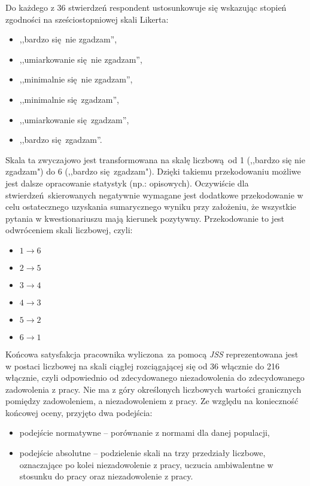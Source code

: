 Do każdego z 36 stwierdzeń respondent ustosunkowuje się wskazując stopień zgodności na sześciostopniowej skali Likerta: 
\begin{itemize}
\item ,,bardzo się nie zgadzam'',
\item ,,umiarkowanie się nie zgadzam'',
\item ,,minimalnie się nie zgadzam'',
\item ,,minimalnie się zgadzam'',
\item ,,umiarkowanie się zgadzam'',
\item ,,bardzo się zgadzam''.
\end{itemize}
Skala ta zwyczajowo jest transformowana na skalę liczbową od 1 (,,bardzo się nie zgadzam") do 6 (,,bardzo się zgadzam"). Dzięki takiemu przekodowaniu możliwe jest dalsze opracowanie statystyk (np.: opisowych). Oczywiście dla stwierdzeń skierowanych negatywnie wymagane jest dodatkowe przekodowanie w celu ostatecznego uzyskania sumarycznego wyniku przy założeniu, że wszystkie pytania w kwestionariuszu mają kierunek pozytywny. Przekodowanie to jest odwróceniem skali liczbowej, czyli:

\begin{itemize}
\item $ 1 \rightarrow 6 $
\item $ 2 \rightarrow 5 $
\item $ 3 \rightarrow 4 $
\item $ 4 \rightarrow 3 $
\item $ 5 \rightarrow 2 $
\item $ 6 \rightarrow 1 $
\end{itemize}

Końcowa satysfakcja pracownika wyliczona za pomocą \emph{JSS} reprezentowana jest w postaci liczbowej na skali ciągłej rozciągającej się od 36 włącznie do 216 włącznie, czyli odpowiednio od zdecydowanego niezadowolenia do zdecydowanego zadowolenia z pracy. Nie ma z góry określonych liczbowych wartości granicznych pomiędzy zadowoleniem, a niezadowoleniem z pracy. Ze względu na konieczność końcowej oceny, przyjęto dwa podejścia:
\begin{itemize}
\item podejście normatywne -- porównanie z normami dla danej populacji,
\item podejście absolutne -- podzielenie skali na trzy przedziały liczbowe, oznaczające po kolei niezadowolenie z pracy, uczucia ambiwalentne w stosunku do pracy oraz niezadowolenie z pracy.
\end{itemize}

